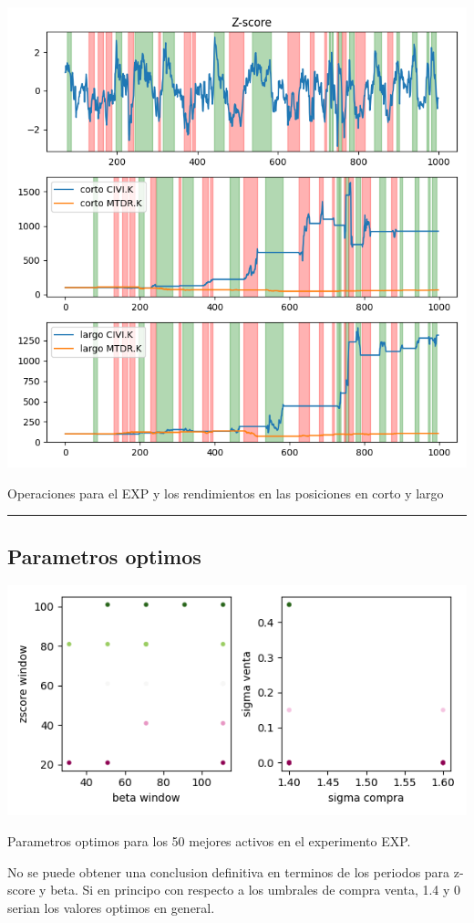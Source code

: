 \documentclass{myarticle}
\begin{document}
\begin{center}
\includegraphics[width=.9\linewidth]{./fig/best_pairs_asset_exp_1000_capital1.png}
\end{center}

Operaciones para el EXP y los rendimientos en las posiciones en corto y largo


\noindent\rule{\textwidth}{0.5pt}
\subsection{Parametros optimos}
\label{sec:orgfa3236b}

\begin{center}
\includegraphics[width=.9\linewidth]{./fig/best_pairs_asset_exp_1000_parameters.png}
\end{center}

Parametros optimos para los 50 mejores activos en el experimento EXP.


No se puede obtener una conclusion definitiva en terminos de los periodos para z-score y beta. Si en principo con respecto a los umbrales de compra venta, 1.4 y 0 serian los valores optimos en general.
\end{document}
